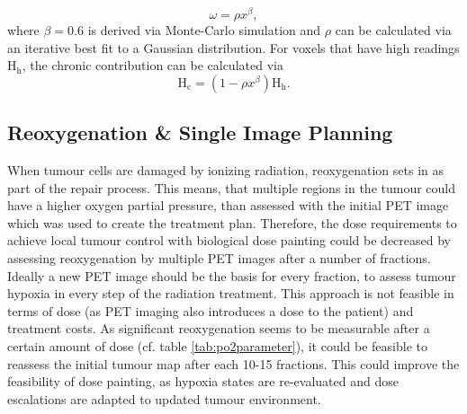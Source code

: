\begin{equation}
\omega = \rho x^\beta,
\end{equation}
where $\beta=0.6$ is derived via Monte-Carlo simulation and $\rho$ can be calculated via an iterative best fit to a Gaussian distribution. For voxels that have high readings H$_\mathrm{h}$, the chronic contribution can be calculated via
\begin{equation}
\mathrm{H}_\mathrm{c} = (1-\rho x^\beta)\mathrm{H}_\mathrm{h}.
\end{equation}
\subsection{Reoxygenation \& Single Image Planning}\label{chap:reoxygenation}
When tumour cells are damaged by ionizing radiation, reoxygenation sets in as part of the repair process. This means, that multiple regions in the tumour could have a higher oxygen partial pressure, than assessed with the initial PET image which was used to create the treatment plan. Therefore, the dose requirements to achieve local tumour control with biological dose painting could be decreased by assessing reoxygenation by multiple PET images after a number of fractions. Ideally a new PET image should be the basis for every fraction, to assess tumour hypoxia in every step of the radiation treatment. This approach is not feasible in terms of dose (as PET imaging also introduces a dose to the patient) and treatment costs. As significant reoxygenation seems to be measurable after a certain amount of dose (cf. table \ref{tab:po2parameter}), it could be feasible to reassess the initial tumour map after each 10-15 fractions. This could improve the feasibility of dose painting, as hypoxia states are re-evaluated and dose escalations are adapted to updated tumour environment. 
